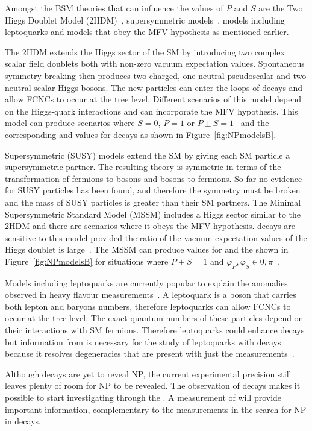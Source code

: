 Amongst the BSM theories that can influence the values of $P$ and $S$ are the Two Higgs Doublet Model (2HDM)~\cite{HALL1981397}, supersymmetric models~\cite{Witten:1981nf}, models including leptoquarks and models that obey the MFV hypothesis as mentioned earlier.

The 2HDM extends the Higgs sector of the SM by introducing two complex scalar field doublets both with non-zero vacuum expectation values. Spontaneous symmetry breaking then produces two charged, one neutral pseudoscalar and two neutral scalar Higgs bosons. The new particles can enter the loops of \bmumu decays and allow FCNCs to occur at the tree level. Different scenarios of this model depend on the Higgs-quark interactions and can incorporate the MFV hypothesis. This model can produce scenarios where $S=0$, $P=1$ or $P\pm S = 1$~\cite{Buras:2013uqa,Knegjens:2014zva} and the corresponding \BF and \ADG values for \bsmumu decays as shown in Figure~\ref{fig:NPmodelsB}.

Supersymmetric (SUSY) models extend the SM by giving each SM particle a supersymmetric partner. The resulting theory is symmetric in terms of the transformation of fermions to bosons and bosons to fermions. So far no evidence for SUSY particles has been found, and therefore the symmetry must be broken and the mass of SUSY particles is greater than their SM partners. The Minimal Supersymmetric Standard Model (MSSM) includes a Higgs sector similar to the 2HDM and there are scenarios where it obeys the MFV hypothesis. \bmumu decays are sensitive to this model provided the ratio of the vacuum expectation values of the Higgs doublet is large~\cite{Buras:2002wq,Babu:1999hn,Isidori:2001fv}. The MSSM can produce values for \ADG and the \bsmumu \BF shown in Figure~\ref{fig:NPmodelsB} for situations where $P\pm S =1$ and $\varphi_P, \varphi_S \in {0, \pi}$~\cite{Buras:2013uqa,Knegjens:2014zva}.

Models including leptoquarks are currently popular to explain the anomalies observed in heavy flavour measurements~\cite{Barbieri:2016las,Becirevic:2016yqi,Hiller:2014yaa,Bauer:2015knc,Fajfer:2015ycq}. A leptoquark is a boson that carries both lepton and baryons numbers, therefore leptoquarks can allow FCNCs to occur at the tree level. The exact quantum numbers of these particles depend on their interactions with SM fermions. Therefore leptoquarks could enhance \bmumu decays but information from \ADG is necessary for the study of leptoquarks with \bmumu decays because it resolves degeneracies that are present with just the \BF measurements~\cite{Altmannshofer:2017wqy}.

Although \bmumu decays are yet to reveal NP, the current experimental precision still leaves plenty of room for NP to be revealed. The observation of \bsmumu decays makes it possible to start investigating \ADG through the \bsmumu \el. A measurement of \ADG will provide important information, complementary to the \bmumu \BF measurements in the search for NP in \bsmumu decays.

